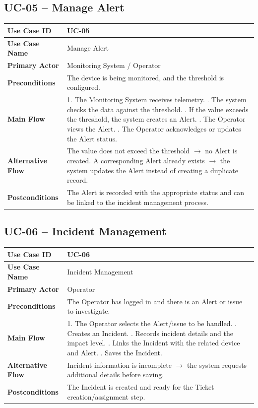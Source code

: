 \subsection*{UC-05 -- Manage Alert}
\noindent
\begin{tabularx}{\textwidth}{|>{\bfseries}p{3.2cm}|X|}
\hline
Use Case ID & UC-05 \\ \hline
Use Case Name & Manage Alert \\ \hline
Primary Actor & Monitoring System / Operator \\ \hline
Preconditions & The device is being monitored, and the threshold is configured. \\ \hline
Main Flow & 1. The Monitoring System receives telemetry. \newline
2. The system checks the data against the threshold. \newline
3. If the value exceeds the threshold, the system creates an Alert. \newline
4. The Operator views the Alert. \newline
5. The Operator acknowledges or updates the Alert status. \\ \hline
Alternative Flow & The value does not exceed the threshold $\rightarrow$ no Alert is created. A corresponding Alert already exists $\rightarrow$ the system updates the Alert instead of creating a duplicate record. \\ \hline
Postconditions & The Alert is recorded with the appropriate status and can be linked to the incident management process. \\ \hline
\end{tabularx}

\vspace{1.5em}

\subsection*{UC-06 -- Incident Management}
\noindent
\begin{tabularx}{\textwidth}{|>{\bfseries}p{3.2cm}|X|}
\hline
Use Case ID & UC-06 \\ \hline
Use Case Name & Incident Management \\ \hline
Primary Actor & Operator \\ \hline
Preconditions & The Operator has logged in and there is an Alert or issue to investigate. \\ \hline
Main Flow & 1. The Operator selects the Alert/issue to be handled. \newline
2. Creates an Incident. \newline
3. Records incident details and the impact level. \newline
4. Links the Incident with the related device and Alert. \newline
5. Saves the Incident. \\ \hline
Alternative Flow & Incident information is incomplete $\rightarrow$ the system requests additional details before saving. \\ \hline
Postconditions & The Incident is created and ready for the Ticket creation/assignment step. \\ \hline
\end{tabularx}

